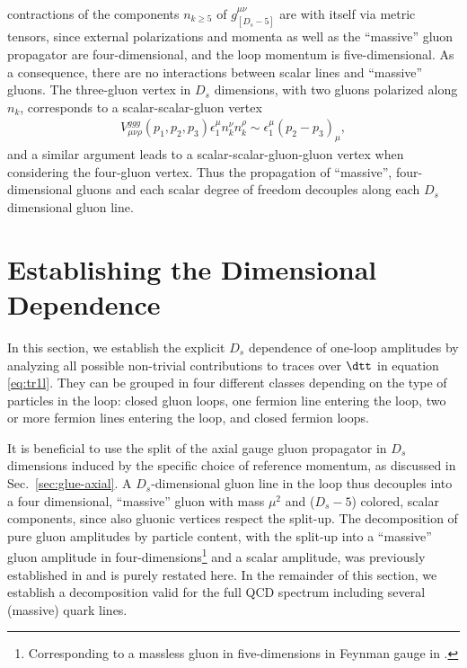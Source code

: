 contractions of the components $n_{k\geq 5}$ of $g^{\mu\nu}_{[D_s-5]}$ are with itself via metric
tensors, since external polarizations and momenta as well as the
``massive'' gluon propagator are four-dimensional, and the loop
momentum is five-dimensional. As a consequence, there are no
interactions between scalar lines and ``massive'' gluons. The three-gluon vertex in $D_s$ dimensions,
with two gluons polarized along $n_k$, corresponds to a
scalar-scalar-gluon vertex
\begin{align}
  V_{\mu\nu\rho}^{ggg}(p_1,p_2,p_3)
  \epsilon_{1}^{\mu}n_{k}^{\nu}n_{k}^{\rho}\sim \epsilon_{1}^{\mu} (p_2-p_3)_\mu,
\end{align}
and a similar argument leads to a scalar-scalar-gluon-gluon
vertex when considering the four-gluon vertex. Thus the propagation of ``massive'', four-dimensional gluons and
each scalar degree of freedom decouples along each $D_s$ dimensional
gluon line.



\section{Establishing the Dimensional Dependence}
\label{sec:gener-spin-chains}
In this section, we establish the explicit $D_s$ dependence of one-loop amplitudes by analyzing all possible non-trivial
contributions to traces over $\dtt$ in equation \eqref{eq:tr1l}. They can be
grouped in four different classes depending on the type of particles in the loop: closed gluon loops, one fermion line entering the loop,
two or more fermion lines entering the loop, and closed fermion loops.

It is beneficial to use the split of the axial gauge gluon propagator in $D_s$ dimensions
induced by the specific choice of reference momentum, as discussed in
Sec.~\ref{sec:glue-axial}. A $D_s$-dimensional gluon line in the loop thus decouples into a four dimensional, ``massive'' gluon with mass
$\mu^2$ and ($D_s-5$) colored, scalar components, since also gluonic
vertices respect the split-up. The decomposition of pure gluon amplitudes by particle content, with the
split-up into a
``massive'' gluon amplitude in four-dimensions\footnote{Corresponding
  to a massless gluon in five-dimensions in Feynman gauge in \cite{Giele:2008ve}.} and a scalar amplitude,
was previously established in \cite{Bern:1994cg} and is purely
restated here. In the remainder of this section, we establish a decomposition
valid for the full QCD spectrum including several (massive) quark lines.

